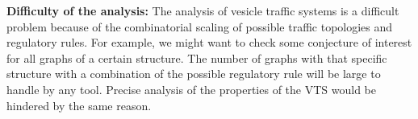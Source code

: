 
\textbf{Difficulty of the analysis:}
The analysis of vesicle traffic systems is a difficult problem
because of the combinatorial scaling of possible traffic topologies and regulatory rules. 
%
For example, we might want to check some conjecture of interest for all graphs of a certain structure. 
%
The number of graphs with that specific structure with a combination of the possible regulatory rule will be large to handle by any tool.
%
Precise analysis of the properties of the VTS would be hindered by the same reason. 
%
%

